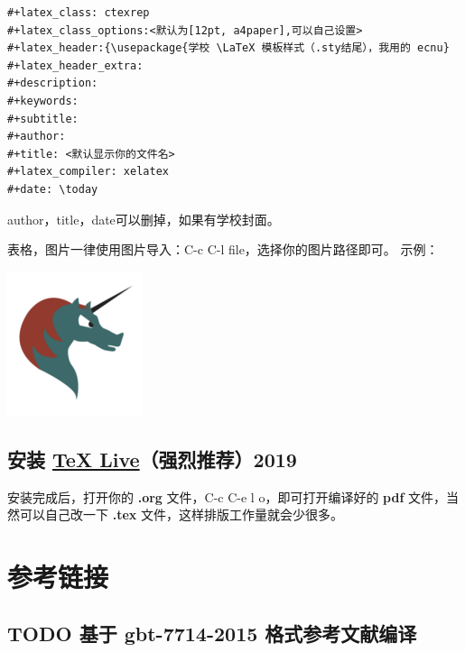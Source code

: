 \documentclass{ctexrep}
\begin{document}
\begin{verbatim}
#+latex_class: ctexrep
#+latex_class_options:<默认为[12pt, a4paper],可以自己设置>
#+latex_header:{\usepackage{学校 \LaTeX 模板样式（.sty结尾），我用的 ecnu}
#+latex_header_extra:
#+description:
#+keywords:
#+subtitle:
#+author: 
#+title: <默认显示你的文件名>
#+latex_compiler: xelatex
#+date: \today 
\end{verbatim}

author，title，date可以删掉，如果有学校封面。

表格，图片一律使用图片导入：C-c C-l file，选择你的图片路径即可。
示例：
\begin{center}
\includegraphics[width=.9\linewidth]{org-mode-unicorn-logo.png}
\end{center}
\subsection{安装 \href{https://zhuanlan.zhihu.com/p/64555335}{\TeX{} Live}（强烈推荐）2019}
\label{sec:orgfd45bc8}
安装完成后，打开你的 \textbf{.org} 文件，C-c C-e l o，即可打开编译好的 \textbf{pdf} 文件，当然可以自己改一下
\textbf{.tex} 文件，这样排版工作量就会少很多。
\section{参考链接}
\label{sec:orgb91b710}
\subsection{{\bfseries\sffamily TODO} 基于 gbt-7714-2015 格式参考文献编译}
\label{sec:org4da2f8a}
\end{document}
